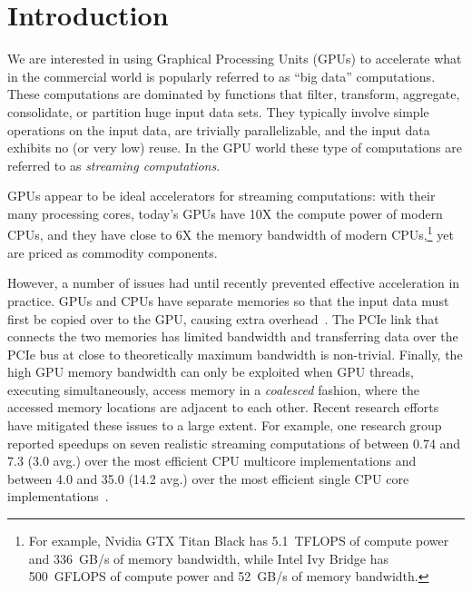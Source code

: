 \section{Introduction}
We are interested in using Graphical Processing Units (GPUs) to accelerate what in the commercial world is popularly
referred to as ``big data'' computations.
These computations are dominated by functions that filter, transform, aggregate, consolidate, or
partition huge input data sets.
They typically involve simple operations on the input data, are trivially parallelizable, and the
input data exhibits no (or very low) reuse.
In the GPU world these type of computations are referred to as \emph{streaming computations}.

GPUs appear to be ideal accelerators for streaming computations: with their many
processing cores, today's GPUs have 10X the compute power of modern CPUs, and they have close to 6X
the memory bandwidth of modern CPUs,\footnote{
	For example, Nvidia GTX Titan Black has 5.1~TFLOPS of compute power and 336~GB/s of memory
	bandwidth, while Intel Ivy Bridge has 500~GFLOPS of compute power and 52~GB/s of
	memory bandwidth.}
yet are priced as commodity components.

However, a number of issues had until recently prevented effective acceleration in practice.
GPUs and CPUs have separate memories so that the input data must first be copied over to the GPU,
causing extra overhead~\cite{gregg2011data}.
The PCIe link that connects the two memories has limited bandwidth and transferring data over
the PCIe bus at close to theoretically maximum bandwidth is non-trivial. 
Finally, the high GPU memory bandwidth can only be exploited when GPU threads, executing simultaneously,
access memory in a \emph{coalesced} fashion, where the accessed memory
locations are adjacent to each other.
Recent research efforts have mitigated these issues to a large extent.
For example, one research group reported speedups on seven realistic streaming computations of between 0.74 and
7.3 (3.0 avg.) over the most efficient CPU multicore implementations and between 4.0 and 35.0 (14.2 avg.) over the most
efficient single CPU core implementations~\cite{mokhtari2014bigkernel}.

